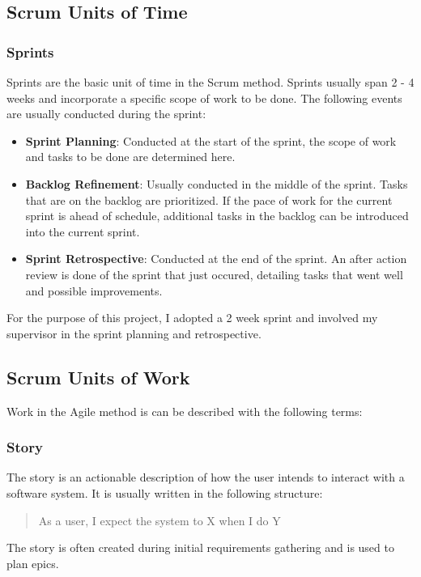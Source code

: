 \subsection{Scrum Units of Time}

\subsubsection{Sprints}

Sprints are the basic unit of time in the Scrum method. Sprints usually span 2 - 4 weeks and incorporate a specific scope of work to be done. The following events are usually conducted during the sprint:

\begin{itemize}
    \item \textbf{Sprint Planning}: Conducted at the start of the sprint, the scope of work and tasks to be done are determined here.
    \item \textbf{Backlog Refinement}: Usually conducted in the middle of the sprint. Tasks that are on the backlog are prioritized. If the pace of work for the current sprint is ahead of schedule, additional tasks in the backlog can be introduced into the current sprint.
    \item \textbf{Sprint Retrospective}: Conducted at the end of the sprint. An after action review is done of the sprint that just occured, detailing tasks that went well and possible improvements.
\end{itemize}
For the purpose of this project, I adopted a 2 week sprint and involved my supervisor in the sprint planning and retrospective.

\subsection{Scrum Units of Work}\label{unitsOfWork}

Work in the Agile method is can be described with the following terms:

\subsubsection{Story}
The story is an actionable description of how the user intends to interact with a software system. It is usually written in the following structure:

\begin{quotation}
    As a user, I expect the system to X when I do Y
\end{quotation}
The story is often created during initial requirements gathering and is used to plan epics.

